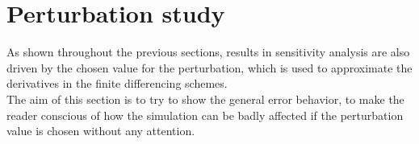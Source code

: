 
\section{Perturbation study} \label{section:perturbationstudy}
As shown throughout the previous sections, results in sensitivity analysis are also driven by the chosen value for the perturbation, which is used to approximate the derivatives in the finite differencing schemes.\\[6pt]
The aim of this section is to try to show the general error behavior, to make the reader conscious of how the simulation can be badly affected if the perturbation value is chosen without any attention.

